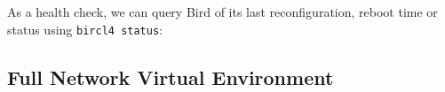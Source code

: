 As a health check, we can query Bird of its last reconfiguration, reboot time or status using \texttt{bircl4 status}:



\subsection{Full Network Virtual Environment}
